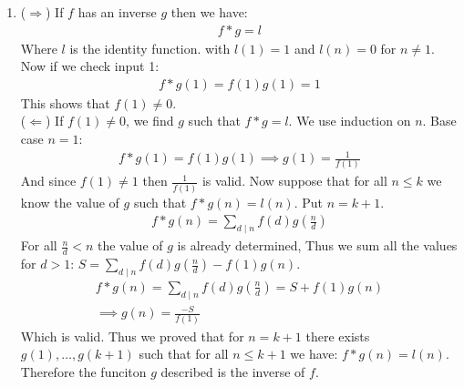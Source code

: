 \begin{enumerate}[label=]
    \item 
        ($\Rightarrow$) If $f$ has an inverse $g$ then we have:
        \begin{gather*}
            f*g = l
        \end{gather*}
        Where $l$ is the identity function. with $l(1) = 1$ and $l(n) = 0$ for $n \ne 1$.
        Now if we check input 1:
        \begin{gather*}
            f*g(1) = f(1) g(1) = 1
        \end{gather*}
        This shows that $f(1) \ne 0$.\\
        ($\Leftarrow$) If $f(1) \ne 0$, we find $g$ such that $f*g = l$. We use induction on $n$. Base case $n = 1$:
        \begin{gather*}
            f*g(1) = f(1) g(1) \implies g(1) = \frac{1}{f(1)}
        \end{gather*}
        And since $f(1) \ne 1$ then $\frac{1}{f(1)}$ is valid. Now suppose that for all $n \le k$ we know the value of $g$ such that $f*g(n) = l(n)$. Put $n = k + 1$.
        \begin{gather*}
            f*g(n) = \sum_{d \mid n} f(d) g(\frac{n}{d})
        \end{gather*}
        For all $\frac{n}{d} < n$ the value of $g$ is already determined, Thus we sum all the values for $d > 1$: $S = \sum_{d \mid n} f(d) g(\frac{n}{d}) - f(1)g(n)$.
        \begin{gather*}
            f*g(n) = \sum_{d \mid n} f(d) g(\frac{n}{d}) = S + f(1) g(n) \\
            \implies g(n) = \frac{-S}{f(1)}
        \end{gather*}
        Which is valid. Thus we proved that for $n = k + 1$ there exists $g(1), \dots, g(k + 1)$ such that for all $n \le k + 1$ we have: $f*g(n) = l(n)$. Therefore the funciton $g$ described is the inverse of $f$.
\end{enumerate}